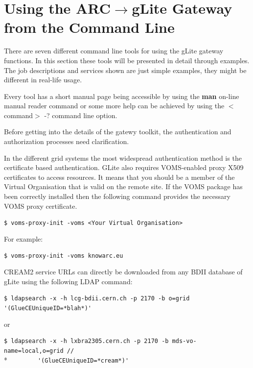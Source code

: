 \documentclass{article}
\begin{document}
\section{Using the ARC${\rightarrow}$gLite Gateway from the Command Line}
\label{Users guide}
There are seven different command line tools for using the gLite gateway functions. In this section these tools will be presented in detail through examples. The job descriptions and services shown are just simple examples, they might be different in real-life usage.\par
Every tool has a short manual page being accessible by using the \textbf{man} on-line manual reader command or some more help can be achieved by using the $<$command$>$ -? command line option.\par
Before getting into the details of the gatewy toolkit, the authentication and authorization processes need clarification.\par
In the different grid systems the most widespread authentication method is the certificate based authentication. GLite also requires VOMS-enabled proxy X509 certificates to access resources. It means that you should be a member of the Virtual Organisation that is valid on the remote site. If the VOMS package has been correctly installed then the following command provides the necessary VOMS proxy certificate.\par
\begin{shaded}\verb#$ voms-proxy-init -voms <Your Virtual Organisation>#\end{shaded}
For example:
\begin{shaded}\verb#$ voms-proxy-init -voms knowarc.eu#\end{shaded}
CREAM2 service URLs can directly be downloaded from any BDII database of gLite using the following LDAP command:
\begin{shaded}
\verb#$ ldapsearch -x -h lcg-bdii.cern.ch -p 2170 -b o=grid '(GlueCEUniqueID=*blah*)'#
\end{shaded}
or
\begin{shaded}
\verb#$ ldapsearch -x -h lxbra2305.cern.ch -p 2170 -b mds-vo-name=local,o=grid //#\\*
\verb#        '(GlueCEUniqueID=*cream*)'#
\end{shaded}
\end{document}
